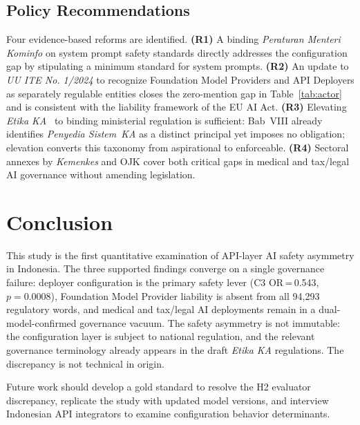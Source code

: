 \documentclass[conference]{IEEEtran}
\begin{document}
\subsection{Policy Recommendations}

Four evidence-based reforms are identified. \textbf{(R1)} A binding \textit{Peraturan
Menteri Kominfo} on system prompt safety standards directly addresses the configuration gap by stipulating a minimum standard for system prompts. \textbf{(R2)} An update to \textit{UU ITE No. 1/2024} to recognize Foundation Model Providers and API Deployers as separately regulable entities closes the zero-mention gap in Table~\ref{tab:actor} and is consistent with the liability framework of the EU AI Act. \textbf{(R3)} Elevating \textit{Etika KA}~\cite{b16} to binding ministerial regulation is sufficient: Bab~VIII already identifies \textit{Penyedia Sistem~KA} as a distinct principal yet imposes no obligation; elevation converts this taxonomy from aspirational to enforceable. \textbf{(R4)} Sectoral annexes by \textit{Kemenkes} and OJK cover both critical gaps in medical and tax/legal AI governance without amending legislation.

\section{Conclusion}

This study is the first quantitative examination of API-layer AI safety asymmetry in Indonesia. The three supported findings converge on a single governance failure: deployer configuration is the primary safety lever (C3 OR\,=\,0.543, $p\!=\!0.0008$), Foundation Model Provider liability is absent from all 94,293 regulatory words, and medical and tax/legal AI deployments remain in a dual-model-confirmed governance vacuum. The safety asymmetry is not immutable: the configuration layer is subject to national regulation, and the relevant governance terminology already appears in the draft \textit{Etika KA} regulations. The discrepancy is not technical in origin.

Future work should develop a gold standard to resolve the H2 evaluator discrepancy, replicate the study with updated model versions, and interview Indonesian API integrators to examine configuration behavior determinants.

\end{document}
